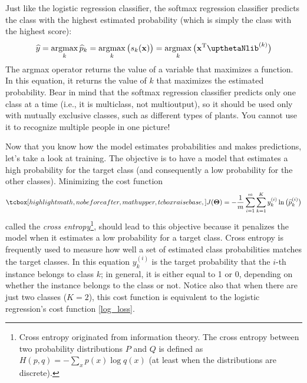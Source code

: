 Just like the logistic regression classifier, the softmax regression classifier predicts the class with the highest estimated probability (which is simply the class with the highest score):
\begin{equation}
\widehat{y}=\argmax_k{\widehat{p}_k}=
\argmax_k{\bigl(s_k(\mathbf{x})\bigr)}=\argmax_k{\bigl(\mathbf{x}^{\mathrm{T}}\boldtheta^{(k)}\bigr)}
\end{equation}
The argmax operator returns the value of a variable that maximizes a function. In this equation, it returns the value of $k$ that maximizes the estimated probability. Bear in mind that the softmax regression classifier predicts only one class at a time (i.e., it is multiclass, not multioutput), so it should be used only with mutually exclusive classes, such as different types of plants. You cannot use it to recognize multiple people in one picture!

Now that you know how the model estimates probabilities and makes predictions, let's take a look at training. The objective is to have a model that estimates a high probability for the target class (and consequently a low probability for the other classes). Minimizing the cost function
\begin{equation}\label{CrossEntropyLoss}
\tcbhighmath{J(\boldsymbol{\Theta})=-\frac{1}{m}\sum_{i=1}^m\sum_{k=1}^Ky_k^{(i)}\ln{\bigl(\widehat{p}_k^{(i)}\bigr)}}
\end{equation}
called the \emph{cross entropy}\footnote{Cross entropy originated from information theory. The cross entropy between two probability distributions $P$ and $Q$ is defined as $H(p,q)=-\sum_xp(x)\log{q(x)}$ (at least when the distributions are discrete).}, should lead to this objective because it penalizes the model when it estimates a low probability for a target class. Cross entropy is frequently used to measure how well a set of estimated class probabilities matches the target classes. In this equation $y_k^{(i)}$ is the target probability that the $i$-th instance belongs to class $k$; in general, it is either equal to 1 or 0, depending on whether the instance belongs to the class or not. Notice also that when there are just two classes ($K=2$), this cost function is equivalent to the logistic regression's cost function \eqref{log_loss}.


